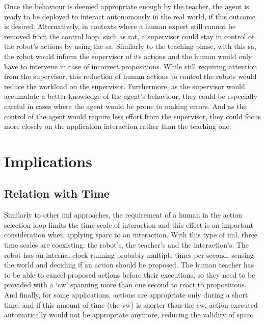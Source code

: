 Once the behaviour is deemed appropriate enough by the teacher, the agent is ready to be deployed to interact autonomously in the real world, if this outcome is desired. Alternatively, in contexts where a human expert still cannot be removed from the control loop, such as \gls{rat}, a supervisor could stay in control of the robot's actions by using the \gls{sa}. Similarly to the teaching phase, with this \gls{sa}, the robot would inform the supervisor of its actions and the human would only have to intervene in case of incorrect propositions. While still requiring attention from the supervisor, this reduction of human actions to control the robots would reduce the workload on the supervisor. Furthermore, as the supervisor would accumulate a better knowledge of the agent's behaviour, they could be especially careful in cases where the agent would be prone to making errors. And as the control of the agent would require less effort from the supervisor, they could focus more closely on the application interaction rather than the teaching one. 

\section{Implications}

\subsection{Relation with Time} \label{ssec:sparc_time}

Similarly to other \gls{iml} approaches, the requirement of a human in the action selection loop limits the time scale of interaction and this effect is an important consideration when applying \gls{sparc} to an interaction. With this type of \gls{iml}, three time scales are coexisting: the robot's, the teacher's and the interaction's. The robot has an internal clock running probably multiple times per second, sensing the world and deciding if an action should be proposed. The human teacher has to be able to cancel proposed actions before their executions, so they need to be provided with a `\gls{cw}' spanning more than one second to react to propositions. And finally, for some applications, actions are appropriate only during a short time, and if this amount of time (the \gls{vw}) is shorter than the \gls{cw}, action executed automatically would not be appropriate anymore, reducing the validity of \gls{sparc}.

